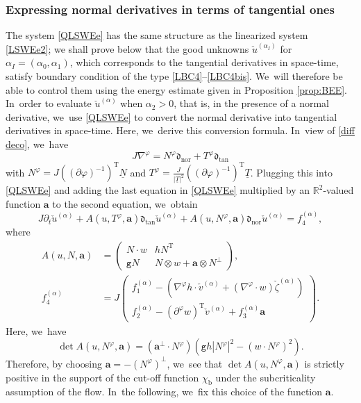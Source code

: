 \documentclass[11pt]{article}
\newcommand{\dtan}{{\mathfrak d}_\mathrm{tan}}
\newcommand{\dnor}{{\mathfrak d}_\mathrm{nor}}
\newcommand{\gr}{{\mathtt g}}
\newcommand{\R}{{\mathbb R}}
\newcommand{\dt}{\partial_t}
\newcommand{\ul}[1]{\underline{#1}}
\theoremstyle{definition}
\begin{document}
\subsubsection{Expressing normal derivatives in terms of tangential ones}
The system \eqref{QLSWEe} has the same structure as the linearized system \eqref{LSWEe2};
we shall prove below that the good unknowns $\check{u}^{(\alpha_I)}$ for $\alpha_I=(\alpha_0,\alpha_1)$,
which corresponds to the tangential derivatives in space-time, satisfy boundary condition of the type \eqref{LBC4}--\eqref{LBC4bis}. We~will therefore be able to control them using the energy estimate given in Proposition \ref{prop:BEE}. In~order to evaluate $\check{u}^{(\alpha)}$ when $\alpha_2>0$, that is, in the presence of a normal derivative, we~use \eqref{QLSWEe} to convert the normal derivative into tangential derivatives in space-time.
Here, we~derive this conversion formula. In~view of \eqref{diff deco}, we~have
\begin{equation}\label{diff deco2}
J\nabla^\varphi=N^\varphi\dnor+T^\varphi\dtan
\end{equation}
with $N^\varphi=J((\partial\varphi)^{-1})^\mathrm{T}\ul{N}$ and $T^\varphi=\frac{J}{|\ul{T}|^2}((\partial\varphi)^{-1})^\mathrm{T}\ul{T}$.
Plugging this into \eqref{QLSWEe} and adding the last equation in \eqref{QLSWEe} multiplied by an $\R^2$-valued function $\bm{a}$ to the second equation, we~obtain
\begin{equation}\label{QLSWEe2}
J\dt\check{u}^{(\alpha)}+A(u,T^\varphi,\bm{a})\dtan\check{u}^{(\alpha)}+A(u,N^\varphi,\bm{a})\dnor\check{u}^{(\alpha)}=f_4^{(\alpha)},
\end{equation}
where
\begin{align*}
A(u,N,\bm{a}) &=
\begin{pmatrix}
N\cdot w & hN^\mathrm{T} \\
\gr N & N\otimes w+\bm{a}\otimes N^\perp
\end{pmatrix}, \\
f_4^{(\alpha)} &= J
\begin{pmatrix}
f_1^{(\alpha)} - (\nabla^\varphi h\cdot\check{v}^{(\alpha)} + (\nabla^\varphi\cdot w)\check{\zeta}^{(\alpha)}) \\
f_2^{(\alpha)} - (\partial^\varphi w)^\mathrm{T}\check{v}^{(\alpha)} + f_3^{(\alpha)}\bm{a}
\end{pmatrix}.
\end{align*}
Here, we~have
\[
\det A(u,N^\varphi,\bm{a}) = (\bm{a}^\perp\cdot N^\varphi)(\gr h|N^\varphi|^2-(w\cdot N^\varphi)^2).
\]
Therefore, by choosing $\bm{a}=-(N^\varphi)^\perp$, we~see that $\det A(u,N^\varphi,\bm{a})$ is strictly positive
in the support of the cut-off function $\chi_\mathrm{b}$ under the subcriticality assumption of the flow. In~the following, we~fix this choice of the function $\bm{a}$.
\end{document}
